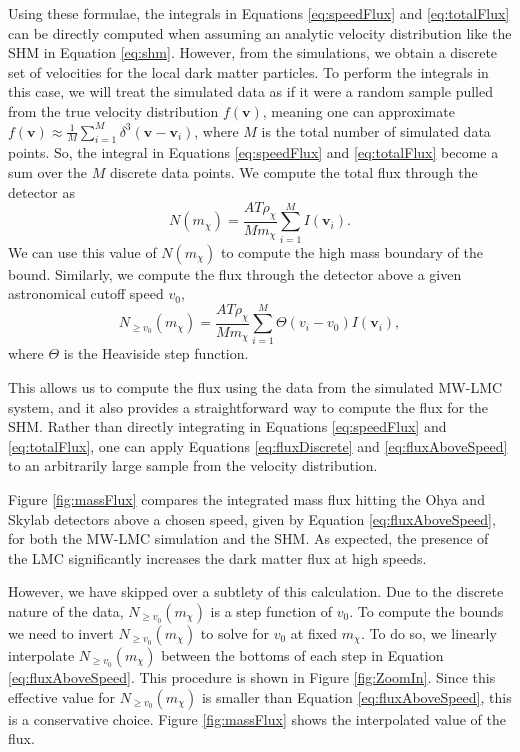 \documentclass[12pt]{article}
\begin{document}
Using these formulae, the integrals in Equations \ref{eq:speedFlux} and \ref{eq:totalFlux} can be directly computed when assuming an analytic velocity distribution like the SHM in Equation \ref{eq:shm}. However, from the simulations, we obtain 
a discrete set of velocities for the local dark matter particles. To perform the integrals in this case, we will treat the simulated data as if it were a random sample pulled from the true velocity distribution $f(\mathbf{v})$, meaning one can approximate $f(\mathbf{v})\approx \frac{1}{M}\sum_{i=1}^M\delta^3(\mathbf{v}-\mathbf{v}_i)$, where $M$ is the total number of simulated data points. So, the integral in Equations \ref{eq:speedFlux} and \ref{eq:totalFlux} become a sum over the $M$ discrete data points. We compute the total flux through the detector as
\begin{equation}\label{eq:fluxDiscrete}
N(m_{\chi})= \frac{AT\rho_{\chi}}{Mm_{\chi}} \sum_{i=1}^M I(\mathbf{v}_i).
\end{equation}
We can use this value of $N(m_\chi)$ to compute the high mass boundary of the bound.
Similarly, we compute the flux through the detector above a given astronomical cutoff speed $v_0$,
\begin{equation}\label{eq:fluxAboveSpeed}
    N_{\geq v_0}(m_{\chi})= \frac{AT\rho_{\chi}}{Mm_{\chi}} \sum_{i=1}^M \Theta(v_i-v_0)  I(\mathbf{v}_i),
\end{equation}
where $\Theta$ is the Heaviside step function. 

This allows us to compute the flux using the data from the simulated MW-LMC system, and it also provides a straightforward way to compute the flux for the SHM. Rather than directly integrating in Equations \ref{eq:speedFlux} and \ref{eq:totalFlux}, one can apply Equations \ref{eq:fluxDiscrete} and \ref{eq:fluxAboveSpeed} to an arbitrarily large sample from the velocity distribution.

Figure \ref{fig:massFlux} compares the integrated mass flux hitting the Ohya and Skylab detectors above a chosen speed, given by Equation \ref{eq:fluxAboveSpeed}, for both the MW-LMC simulation and the SHM. As expected, the presence of the LMC significantly increases the dark matter flux at high speeds.

However, we have skipped over a subtlety of this calculation. Due to the discrete nature of the data, $N_{\geq v_0}(m_{\chi})$ is a step function of $v_0$. To compute the bounds we need to invert $N_{\geq v_0}(m_{\chi})$ to solve for $v_0$ at fixed $m_\chi$. To do so, we linearly interpolate $N_{\geq v_0}(m_{\chi})$ between the bottoms of each step in Equation \ref{eq:fluxAboveSpeed}. This procedure is shown in Figure \ref{fig:ZoomIn}.  Since this effective value for $N_{\geq v_0}(m_{\chi})$ is smaller than Equation \ref{eq:fluxAboveSpeed}, this is a conservative choice. Figure \ref{fig:massFlux} shows the interpolated value of the flux.
\end{document}
